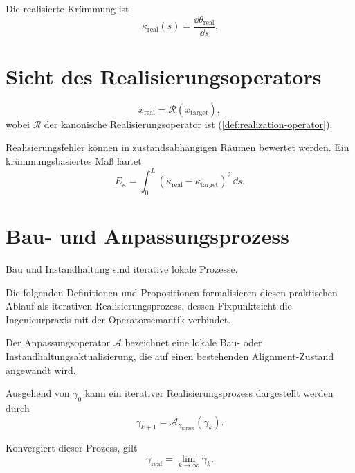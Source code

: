\begin{definition}
\label{def:realized-curvature}
Die realisierte Krümmung ist
\[
\kappa_{\mathrm{real}}(s)=\frac{\dd\theta_{\mathrm{real}}}{\dd s}.
\]
\end{definition}

\section{Sicht des Realisierungsoperators}

\[
x_{\mathrm{real}}=\mathcal R(x_{\mathrm{target}}),
\]
wobei \(\mathcal R\) der kanonische Realisierungsoperator ist
(\cref{def:realization-operator}).

Realisierungsfehler können in zustandsabhängigen Räumen bewertet werden. Ein
krümmungsbasiertes Maß lautet
\[
E_{\kappa}
=
\int_0^L\left(\kappa_{\mathrm{real}}-\kappa_{\mathrm{target}}\right)^2\,\dd s.
\]

\section{Bau- und Anpassungsprozess}

Bau und Instandhaltung sind iterative lokale Prozesse.

Die folgenden Definitionen und Propositionen formalisieren diesen praktischen
Ablauf als iterativen Realisierungsprozess, dessen Fixpunktsicht die
Ingenieurpraxis mit der Operatorsemantik verbindet.

\begin{definition}[Anpassungsoperator]
\label{def:adjustment-operator}
Der Anpassungsoperator \(\mathcal A\) bezeichnet eine lokale Bau- oder
Instandhaltungsaktualisierung, die auf einen bestehenden Alignment-Zustand
angewandt wird.
\end{definition}

\begin{definition}
\label{def:iterative-construction-realization}
Ausgehend von \(\gamma_0\) kann ein iterativer Realisierungsprozess dargestellt
werden durch
\[
\gamma_{k+1}=\mathcal A_{\gamma_{\mathrm{target}}}(\gamma_k).
\]
\end{definition}

\begin{definition}
\label{def:realized-alignment-limit}
Konvergiert dieser Prozess, gilt
\[
\gamma_{\mathrm{real}}=\lim_{k\to\infty}\gamma_k.
\]
\end{definition}

